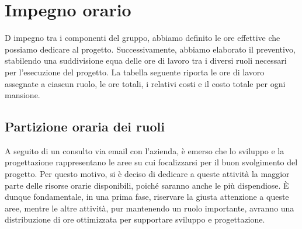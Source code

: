 \section{Impegno orario}

D impegno tra i componenti del gruppo, abbiamo definito le ore effettive che possiamo dedicare al progetto. Successivamente, abbiamo elaborato il preventivo, stabilendo una suddivisione equa delle ore di lavoro tra i diversi ruoli necessari per l’esecuzione del progetto. La tabella seguente riporta le ore di lavoro assegnate a ciascun ruolo, le ore totali, i relativi costi e il costo totale per ogni mansione.

\vspace{0.5cm}

\begin{table}[h]
    \centering
    \caption{Ripartizione oraria e dettaglio dei costi}
\end{table}

\vspace{0.5cm}

\subsection{Partizione oraria dei ruoli}
A seguito di un consulto via email con l'azienda, è emerso che lo sviluppo e la progettazione rappresentano le aree su cui focalizzarsi per il buon svolgimento del progetto. Per questo motivo, si è deciso di dedicare a queste attività la maggior parte delle risorse orarie disponibili, poiché saranno anche le più dispendiose. È dunque fondamentale, in una prima fase, riservare la giusta attenzione a queste aree, mentre le altre attività, pur mantenendo un ruolo importante, avranno una distribuzione di ore ottimizzata per supportare sviluppo e progettazione.

